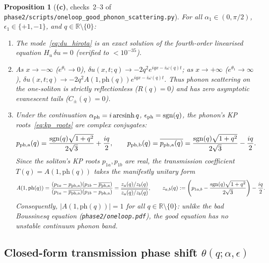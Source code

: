 \documentclass[11pt,a4paper]{article}
\newcommand{\Lc}{\textsf{\textbf{(c)}}}
\newcommand{\script}[1]{\texttt{phase2/\allowbreak scripts/\allowbreak #1}}
\newtheorem{proposition}{Proposition}[section]
\theoremstyle{remark}
\begin{document}
\begin{proposition}[\Lc, checks~2--3 of \script{oneloop\_good\_phonon\_scattering.py}]\label{prop:phonon_scatt}
For all $\alpha_1\in(0,\pi/2)$, $\epsilon_1\in\{+1,-1\}$, and $q\in\mathbb{R}\setminus\{0\}$:
\begin{enumerate}
\item The mode~\eqref{eq:du_hirota} is an exact solution of the fourth-order linearised equation $H_u\,\delta u=0$ (verified to $<10^{-35}$).
\item As $x\to-\infty$ ($e^{\theta_1}\to 0$), $\delta u(x,t;q)\to -2q^2 e^{iqx-i\omega(q)t}$; as $x\to+\infty$ ($e^{\theta_1}\to\infty$), $\delta u(x,t;q)\to -2q^2 A(1,\mathrm{ph}(q))e^{iqx-i\omega(q)t}$. Thus \emph{phonon scattering on the one-soliton is strictly reflectionless ($R(q)=0$) and has zero asymptotic evanescent tails ($C_\pm(q)=0$)}.
\item Under the continuation $\alpha_{\rm ph}=i\operatorname{arcsinh}q$, $\epsilon_{\rm ph}=\operatorname{sgn}(q)$, the phonon's KP roots~\eqref{eq:kp_roots} are complex conjugates:
\begin{equation}\label{eq:kp_phonon}
p_{\rm ph,a}(q)=\frac{\operatorname{sgn}(q)\sqrt{1+q^2}}{2\sqrt{3}}+\frac{iq}{2},\qquad
p_{\rm ph,b}(q)=\overline{p_{\rm ph,a}(q)}=\frac{\operatorname{sgn}(q)\sqrt{1+q^2}}{2\sqrt{3}}-\frac{iq}{2}.
\end{equation}
Since the soliton's KP roots $p_{1a},p_{1b}$ are real, the transmission coefficient $T(q)=A(1,\mathrm{ph}(q))$ takes the manifestly unitary form
\begin{equation}\label{eq:A_unitary}
A(1,\mathrm{ph}(q))=\frac{(p_{1a}-p_{\rm ph,a})(p_{1b}-\overline{p_{\rm ph,a}})}{(p_{1a}-\overline{p_{\rm ph,a}})(p_{1b}-p_{\rm ph,a})}
=\frac{z_a(q)/z_b(q)}{\overline{z_a(q)/z_b(q)}},\qquad
z_{a,b}(q):=\left(p_{1a,b}-\frac{\operatorname{sgn}(q)\sqrt{1+q^2}}{2\sqrt{3}}\right)-\frac{iq}{2}.
\end{equation}
Consequently, $|A(1,\mathrm{ph}(q))|=1$ for \emph{all} $q\in\mathbb{R}\setminus\{0\}$: unlike the bad Boussinesq equation (\texttt{phase2/oneloop.pdf}), the good equation has no unstable continuum phonon band.
\end{enumerate}
\end{proposition}

\subsection{Closed-form transmission phase shift $\theta(q;\alpha,\epsilon)$}
\end{document}
